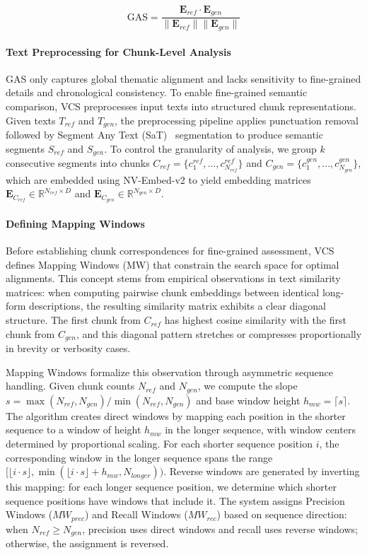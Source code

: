 \documentclass[letterpaper]{article} %
\begin{document}
\begin{equation} \label{eq:gas_revised}
\text{GAS} = \frac{\mathbf{E}_{ref} \cdot \mathbf{E}_{gen}}{\|\mathbf{E}_{ref}\| \|\mathbf{E}_{gen}\|}
\end{equation}

\paragraph{Text Preprocessing for Chunk-Level Analysis}
GAS only captures global thematic alignment and lacks sensitivity to fine-grained details and chronological consistency. To enable fine-grained semantic comparison, VCS preprocesses input texts into structured chunk representations. Given texts $T_{ref}$ and $T_{gen}$, the preprocessing pipeline applies punctuation removal followed by Segment Any Text (SaT)~\citep{frohmann-etal-2024-segment} segmentation to produce semantic segments $S_{ref}$ and $S_{gen}$. To control the granularity of analysis, we group $k$ consecutive segments into chunks $C_{ref} = \{c_1^{ref}, ..., c_{N_{ref}}^{ref}\}$ and $C_{gen} = \{c_1^{gen}, ..., c_{N_{gen}}^{gen}\}$, which are embedded using NV-Embed-v2 to yield embedding matrices $\mathbf{E}_{C_{ref}} \in \mathbb{R}^{N_{ref} \times D}$ and $\mathbf{E}_{C_{gen}} \in \mathbb{R}^{N_{gen} \times D}$.

\paragraph{Defining Mapping Windows}
Before establishing chunk correspondences for fine-grained assessment, VCS defines Mapping Windows (MW) that constrain the search space for optimal alignments. This concept stems from empirical observations in text similarity matrices: when computing pairwise chunk embeddings between identical long-form descriptions, the resulting similarity matrix exhibits a clear diagonal structure. The first chunk from $C_{ref}$ has highest cosine similarity with the first chunk from $C_{gen}$, and this diagonal pattern stretches or compresses proportionally in brevity or verbosity cases.

Mapping Windows formalize this observation through asymmetric sequence handling. Given chunk counts $N_{ref}$ and $N_{gen}$, we compute the slope $s = \max(N_{ref}, N_{gen}) / \min(N_{ref}, N_{gen})$ and base window height $h_{mw} = \lceil s \rceil$. The algorithm creates direct windows by mapping each position in the shorter sequence to a window of height $h_{mw}$ in the longer sequence, with window centers determined by proportional scaling. For each shorter sequence position $i$, the corresponding window in the longer sequence spans the range $[\lfloor i \cdot s \rfloor, \min(\lfloor i \cdot s \rfloor + h_{mw}, N_{longer}))$. Reverse windows are generated by inverting this mapping: for each longer sequence position, we determine which shorter sequence positions have windows that include it. The system assigns Precision Windows ($MW_{prec}$) and Recall Windows ($MW_{rec}$) based on sequence direction: when $N_{ref} \geq N_{gen}$, precision uses direct windows and recall uses reverse windows; otherwise, the assignment is reversed.
\end{document}
